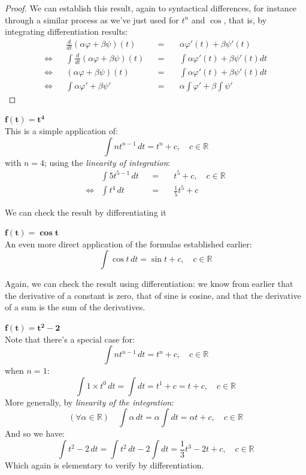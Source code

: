 \documentclass[solutions.tex]{subfiles}
\begin{document}
\begin{proof}
We can establish this result, again to syntactical differences, for instance
through a similar process as we've just used for $t^n$ and $\cos$, that is, by
integrating differentiation results:
\begin{equation*} \begin{aligned}
	~ && \frac{d}{dt}(\alpha\varphi+\beta\psi)(t) &&=\quad& \alpha\varphi'(t)+\beta\psi'(t) \\
	\Leftrightarrow && \int\frac{d}{dt}(\alpha\varphi+\beta\psi)(t) &&=\quad&
		\int\alpha\varphi'(t)+\beta\psi'(t) dt \\
	\Leftrightarrow && (\alpha\varphi+\beta\psi)(t) &&=\quad&
		\int\alpha\varphi'(t)+\beta\psi'(t) dt \\
	\Leftrightarrow && \int\alpha\varphi'+\beta\psi' &&=\quad&
		\alpha\int\varphi'+\beta\int\psi'
\end{aligned} \end{equation*}
\end{proof}

\hr
$\bm{f(t) = t^4}$\ \\
This is a simple application of:
\[
	\int nt^{n-1}\,dt = t^n + c,\quad c\in\mathbb{R}
\]
with $n=4$; using the \textit{linearity of integration}:
\begin{equation*} \begin{aligned}
	~ & \int 5t^{5-1}\,dt &&=\quad& t^5 + c,\quad c\in\mathbb{R} \\
	\Leftrightarrow & \int t^4\,dt &&=\quad& \boxed{\frac15t^5 + c}
\end{aligned} \end{equation*}

\begin{remark} We can check the result by differentiating it
\end{remark}

\hr
$\bm{f(t) = \cos t}$\ \\
An even more direct application of the formulas established earlier:
\[
	\int\cos t\,dt = \boxed{\sin t + c},\quad c\in\mathbb{R}
\]
\begin{remark} Again, we can check the result using differentiation:
we know from earlier that the derivative of a constant is zero, that
of sine is cosine, and that the derivative of a sum is the sum
of the derivatives.
\end{remark}

\hr
$\bm{f(t) = t^2 - 2}$\ \\
Note that there's a special case for:
\[
	\int nt^{n-1}\,dt = t^n + c,\quad c\in\mathbb{R}
\]
when $n=1$:
\[
	\int 1\times t^{0}\,dt = \int dt = t^1 + c = t + c,\quad c\in\mathbb{R}
\]
More generally, by \textit{linearity of the integration}:
\[
	(\forall \alpha\in\mathbb{R})\quad \int\alpha\,dt =
		\alpha\int dt = \alpha t + c,\quad c\in\mathbb{R}
\]
And so we have:
\[
	\int t^2-2\,dt = \int t^2\,dt - 2\int dt = \boxed{\frac13t^3-2t+c},\quad c\in\mathbb{R}
\]
Which again is elementary to verify by differentiation.
\end{document}
